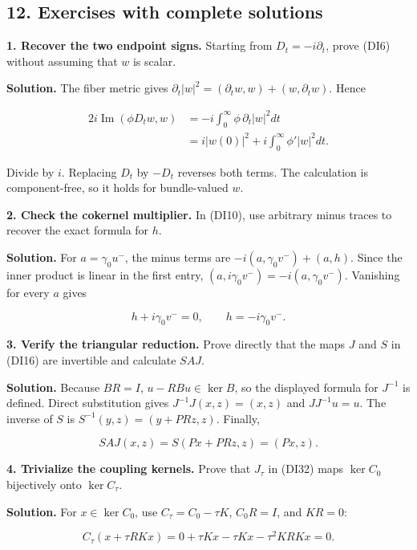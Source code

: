 \documentclass[
  11pt,
]{article}
\begin{document}
\subsection{12. Exercises with complete
solutions}\label{exercises-with-complete-solutions}

\textbf{1. Recover the two endpoint signs.} Starting from
\(D_t=-i\partial_t\), prove (DI6) without assuming that \(w\) is scalar.

\textbf{Solution.} The fiber metric gives
\(\partial_t|w|^2=(\partial_tw,w)+(w,\partial_tw)\). Hence

\[
 \begin{aligned}
 2i\operatorname{Im}(\phi D_tw,w)
 &=-i\int_0^\infty\phi\,\partial_t|w|^2dt\\
 &=i|w(0)|^2+i\int_0^\infty\phi'|w|^2dt.
 \end{aligned}
 \tag{DI50}
\]

Divide by \(i\). Replacing \(D_t\) by \(-D_t\) reverses both terms. The
calculation is component-free, so it holds for bundle-valued \(w\).

\textbf{2. Check the cokernel multiplier.} In (DI10), use arbitrary
minus traces to recover the exact formula for \(h\).

\textbf{Solution.} For \(a=\gamma_0u^-\), the minus terms are
\(-i(a,\gamma_0v^-)+(a,h)\). Since the inner product is linear in the
first entry, \((a,i\gamma_0v^-)=-i(a,\gamma_0v^-)\). Vanishing for every
\(a\) gives

\[
 h+i\gamma_0v^-=0,\qquad h=-i\gamma_0v^-.
 \tag{DI51}
\]

\textbf{3. Verify the triangular reduction.} Prove directly that the
maps \(J\) and \(S\) in (DI16) are invertible and calculate \(SAJ\).

\textbf{Solution.} Because \(BR=I\), \(u-RBu\in\ker B\), so the
displayed formula for \(J^{-1}\) is defined. Direct substitution gives
\(J^{-1}J(x,z)=(x,z)\) and \(JJ^{-1}u=u\). The inverse of \(S\) is
\(S^{-1}(y,z)=(y+PRz,z)\). Finally,

\[
 SAJ(x,z)=S(Px+PRz,z)=(Px,z).
 \tag{DI52}
\]

\textbf{4. Trivialize the coupling kernels.} Prove that \(J_\tau\) in
(DI32) maps \(\ker C_0\) bijectively onto \(\ker C_\tau\).

\textbf{Solution.} For \(x\in\ker C_0\), use \(C_\tau=C_0-\tau K\),
\(C_0R=I\), and \(KR=0\):

\[
 C_\tau(x+\tau RKx)=0+\tau Kx-\tau Kx-\tau^2KRKx=0.
 \tag{DI53}
\]
\end{document}
